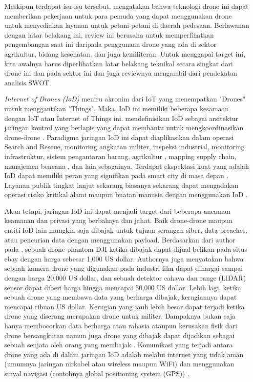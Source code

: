 Meskipun terdapat isu-isu tersebut, \cite[Sylvester (2018)]{sylvester2018agriculture} mengatakan bahwa teknologi drone ini dapat memberikan pekerjaan untuk para pemuda yang dapat menggunakan drone untuk menyediakan layanan untuk petani-petani di daerah pedesaan. Berlawanan dengan latar belakang ini, review ini berusaha untuk memperlihatkan pengembangan saat ini daripada penggunaan drone yang ada di sektor agrikultur, bidang kesehatan, dan juga kemiliteran. Untuk menggapai target ini, kita awalnya harus diperlihatkan latar belakang teknikal secara singkat dari drone ini dan pada sektor ini dan juga reviewnya mengambil dari pendekatan analisis SWOT.

\emph{Internet of Drones (IoD)} meniru akronim dari IoT yang menempatkan "Drones" untuk menggantikan "Things". Maka, IoD ini memiliki beberapa kesamaan dengan IoT atau Internet of Things ini. \citet{gharibi2016internet} mendefinisikan IoD sebagai arsitektur jaringan kontrol yang berlapis yang dapat membantu untuk mengkoordinasikan drone-drone \citep{choudhary2018internet}. Paradigma jaringan IoD ini dapat diaplikasikan dalam operasi Search and Rescue, monitoring angkatan militer, inspeksi industrial, monitoring infrastruktur, sistem pengantaran barang\citep{times2020food}, agrikultur \citep{yazdinejad2020enabling} \citep{boursianis2020internet}, mapping supply chain, manajemen bencana \citep{magistretti2019unveiling} \citep{paddeu2019new}, dan lain sebagainya. Terdapat ekspektasi kuat yang adalah IoD dapat memiliki peran yang signifikan pada smart city di masa depan \citep{vattapparamban2016drones}. Layanan publik tingkat lanjut sekarang biasanya sekarang dapat mengadakan operasi risiko kritikal alami maupun buatan manusia dengan menggunakan IoD \citep{polka2017use} \citep{kharchenko2018cybersecurity}. 

Akan tetapi, jaringan IoD ini dapat menjadi target dari beberapa ancaman keamanan dan privasi yang berbahaya dan jahat. Baik drone-drone maupun entiti IoD lain mungkin saja dibajak untuk tujuan serangan siber, data breaches, atau pencurian data dengan menggunakan payload. Berdasarkan dari author pada \citep{thiobane2015cybersecurity}, sebuah drone phantom DJI ketika dibajak dapat dijual belikan pada situs ebay dengan harga sebesar 1,000 US dollar. Authornya juga menyatakan bahwa sebuah kamera drone yang digunakan pada industri film dapat dihargai sampai dengan harga 20,000 US dollar, dan sebuah detektor cahaya dan range (LIDAR) sensor dapat diberi harga hingga mencapai 50,000 US dollar. Lebih lagi, ketika sebuah drone yang membawa data yang berharga dibajak, kerugiannya dapat mencapai ribuan US dollar. Kerugian yang jauh lebih besar dapat terjadi ketika drone yang diserang merupakan drone untuk militer. Dampaknya bukan saja hanya membocorkan data berharga atau rahasia ataupun kerusakan fisik dari drone bersangkutan namun juga drone yang dibajak dapat dijadikan sebagai sebuah senjata oleh orang yang membajak \citep{thiobane2015cybersecurity}. Komunikasi yang terjadi antara drone yang ada di dalam jaringan IoD adalah melalui internet yang tidak aman (umumnya jaringan nirkabel atau wireless maupun WiFi) dan menggunakan sinyal navigasi (contohnya global positioning system (GPS)) \citep{rodrigues2019authentication}. 

